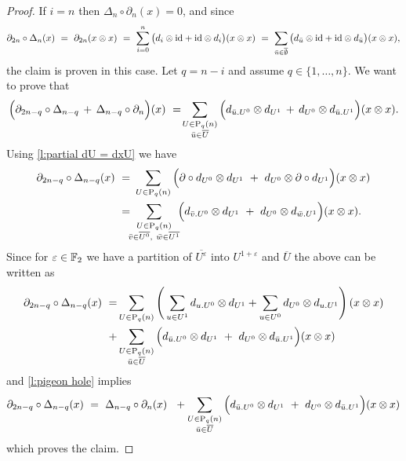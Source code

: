 \begin{proof}
	If $i = n$ then $\Delta_n \circ \partial_n (x) = 0$, and since
	\begin{equation*}
	\partial_{2n} \circ \Delta_n (x) \ = \
	\partial_{2n} (x \otimes x) \ = \
	\sum_{i=0}^n \big( d_i \otimes \mathrm{id} + \mathrm{id} \otimes d_i \big)(x \otimes x) \ = \
	\sum_{{\bar{u}} \in \overline{\emptyset}} \big( d_{\bar{u}} \otimes \mathrm{id} + \mathrm{id} \otimes d_{\bar{u}} \big)(x \otimes x),
	\end{equation*}
	the claim is proven in this case.
	Let $q = n-i$ and assume $q \in \{1,\dots,n\}$.
	We want to prove that
	\begin{equation*}
	\Big( \partial_{2n-q} \circ \Delta_{n - q} \, +\, \Delta_{n-q} \circ \partial_n \Big) (x) \ = \! 
	\sum_{\substack{U \in \mathrm{P}_{q}(n) \\ {\bar{u}} \in \overline{U}}} \Big( d_{{\bar{u}}.U^0} \otimes d_{U^1} \, + \, d_{U^0} \otimes d_{{\bar{u}}.U^1} \Big) (x \otimes x).
	\end{equation*}
	Using \cref{l:partial dU = dxU} we have
	\begin{equation*}
	\begin{split}
	\partial_{2n-q} \circ \Delta_{n - q} (x) \ = & \
	\sum_{U \in \P_q(n)} \Big( \partial \circ d_{U^0} \otimes d_{U^1}\ +\
	d_{U^0} \otimes \partial \circ d_{U^1} \Big) (x \otimes x) \\ = & \!\!
	\sum_{\substack{U \in \P_q(n) \\ \bar v \in \overline{U^0},\ \bar w \in \overline{U^1} } }\!\! \Big( d_{\bar v.U^0} \otimes d_{U^1}\ +\ d_{U^0} \otimes d_{\bar w.U^1}\Big) (x \otimes x).
	\end{split}
	\end{equation*}
	Since for $\varepsilon \in \mathbb{F}_2$ we have a partition of $\overline{U^\varepsilon}$ into $U^{1+\varepsilon}$ and $\overline{U}$ the above can be written as
	\begin{align*}
	\partial_{2n-q} \circ \Delta_{n - q} (x) \ = &
	\sum_{U \in \mathrm{P}_q(n)} \left( \,
	\sum_{u \in U^1} d_{u.U^0} \otimes d_{U^1} + 
	\sum_{u \in U^0} d_{U^0} \otimes d_{u.U^1} \right)(x \otimes x) \\ + & 
	\sum_{\substack{U\in\mathrm{P}_{q}(n) \\ {\bar{u}} \in \overline{U}}} \Big( d_{{\bar{u}}.U^0} \otimes d_{U^1}\ +\ d_{U^0} \otimes d_{{\bar{u}}.U^1}\Big) (x \otimes x)
	\end{align*}
	and \cref{l:pigeon hole} implies	
	\begin{align*}
	\partial_{2n-q} \circ \Delta_{n - q} (x) \ = \
	\Delta_{n-q} \circ \partial_n (x) \ \  +
	\sum_{\substack{U\in\mathrm{P}_{q}(n) \\ {\bar{u}} \in \overline{U}}} \Big( d_{{\bar{u}}.U^0} \otimes d_{U^1}\ +\ d_{U^0} \otimes d_{{\bar{u}}.U^1}\Big) (x \otimes x)
	\end{align*}
	which proves the claim.
\end{proof}

